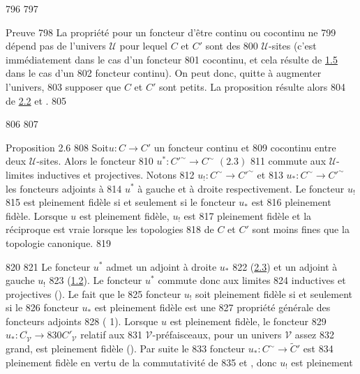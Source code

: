    796	
   797	\begin{enonce*}[remark]{Preuve}
   798	La propriété pour un foncteur d'être continu ou cocontinu ne
   799	dépend pas de l'univers $𝒰$ pour lequel $C$ et $C'$ sont des
   800	$𝒰$-sites (c'est immédiatement dans le cas d'un foncteur
   801	cocontinu, et cela résulte de \hyperref[III.prop1.5]{1.5} dans le cas d'un
   802	foncteur continu). On peut donc, quitte à augmenter l'univers,
   803	supposer que $C$ et $C'$ sont petits. La proposition résulte alors
   804	de \hyperref[III.prop2.2]{2.2} et .
   805	\end{enonce*}
   806	
   807	\begin{enonce*}{Proposition 2.6}
   808	Soit\pageoriginale $u:C\rightarrow C'$ un foncteur continu et
   809	cocontinu entre deux $𝒰$-sites. Alors le foncteur
   810	$u^{\ast}:{C'}^{\sim}\rightarrow C^{\sim}$ $(\hyperref[III.prop2.3]{2.3})$
   811	commute aux $𝒰$-limites inductives et projectives. Notons
   812	$u_{!}:C^{\sim}\rightarrow {C'}^{\sim}$ et
   813	$u_{\ast}:C^{\sim}\rightarrow {C'}^{\sim}$ les foncteurs adjoints à
   814	$u^{\ast}$ à gauche et à droite respectivement. Le foncteur $u_{!}$
   815	est pleinement fidèle si et seulement si le foncteur $u_{\ast}$ est
   816	pleinement fidèle. Lorsque $u$ est pleinement fidèle, $u_{!}$ est
   817	pleinement fidèle et la réciproque est vraie lorsque les topologies
   818	de $C$ et $C'$ sont moins fines que la topologie canonique.
   819	\end{enonce*}
   820	
   821	Le foncteur $u^{\ast}$ admet un adjoint à droite $u_{\ast}$
   822	(\hyperref[III.prop2.3]{2.3}) et un adjoint à gauche $u_{!}$
   823	(\hyperref[III.prop1.2]{1.2}). Le foncteur $u^{\ast}$ commute donc aux limites
   824	inductives et projectives (). Le fait que le
   825	foncteur $u_{!}$ soit pleinement fidèle si et seulement si le
   826	foncteur $u_{\ast}$ est pleinement fidèle est une
   827	propriété générale des foncteurs adjoints
   828	( 1). Lorsque $u$ est pleinement fidèle, le foncteur
   829	$\widehat{u}_{\ast}:C^{\widehat{\phantom{,}}}_{𝒱}\rightarrow
   830	{C'}^{\widehat{\phantom{,}}}_{𝒱}$ relatif aux
   831	$𝒱$-préfaisceaux, pour un univers $𝒱$ assez
   832	grand, est pleinement fidèle (). Par suite le
   833	foncteur $u_{\ast}:C^{\sim}\rightarrow \widetilde{C}'$ est
   834	pleinement fidèle en vertu de la commutativité de
   835	 et , donc $u_{!}$ est pleinement
